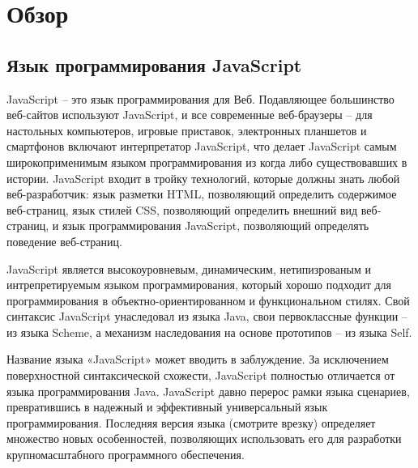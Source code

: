 \chapter{Обзор}

\section{Язык программирования JavaScript}

JavaScript -- это язык программирования для Веб. Подавляющее большинство веб-сайтов используют JavaScript, и все современные веб-браузеры -- для настольных компьютеров, игровые приставок, электронных планшетов и смартфонов включают интерпретатор JavaScript, что делает JavaScript самым широкоприменимым языком программирования из когда либо существовавших в истории. JavaScript входит в тройку технологий, которые должны знать  любой веб-разработчик: язык разметки HTML, позволяющий определить содержимое веб-страниц, язык стилей CSS, позволяющий определить внешний вид веб-страниц, и язык программирования JavaScript, позволяющий определять поведение веб-страниц.

JavaScript является высокоуровневым, динамическим, нетипизрованым и интрепретируемым языком программирования, который хорошо подходит для программирования в объектно-ориентированном и функциональном стилях. Свой синтаксис JavaScript унаследовал из языка Java, свои первоклассные функции -- из языка Scheme, а механизм наследования на основе прототипов -- из языка Self. 

Название языка «JavaScript» может вводить в заблуждение. За исключением поверхностной синтаксической схожести, JavaScript полностью отличается от языка программирования Java. JavaScript давно перерос рамки языка сценариев, превратившись в надежный и эффективный универсальный язык программирования. Последняя версия языка (смотрите врезку) определяет множество новых особенностей, позволяющих использовать его для разработки крупномасштабного программного обеспечения.
\cite{JsDef6}


